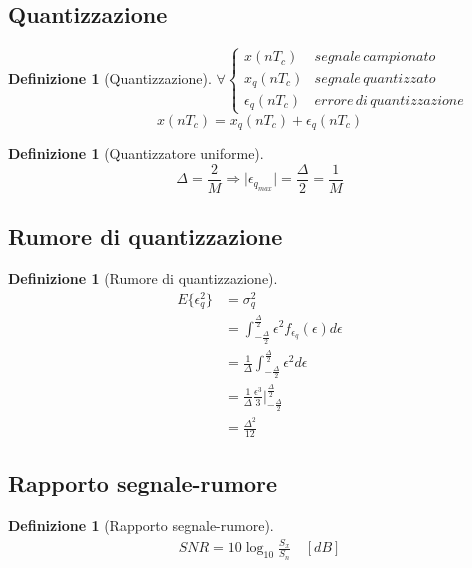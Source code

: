 \documentclass[a4paper,10pt]{article}
\theoremstyle{mystyle}
\newtheorem{definition}[theorem]{Definizione}
\begin{document}
\subsection{Quantizzazione}
\begin{definition}[Quantizzazione]
    \(\forall
    \begin{cases}
        x(nT_c) & segnale \, campionato \\
        x_q(nT_c) & segnale \, quantizzato \\
        \epsilon_q(nT_c) & errore \, di \, quantizzazione
    \end{cases}\)
    \[x(nT_c)=x_q(nT_c)+\epsilon_q(nT_c)\]
\end{definition}

\begin{definition}[Quantizzatore uniforme]
    \[\Delta = \frac{2}{M} \Rightarrow \lvert \epsilon_{q_{max}} \rvert = \frac{\Delta}{2}= \frac{1}{M}\]
\end{definition}

\subsection{Rumore di quantizzazione}
\begin{definition}[Rumore di quantizzazione]
    \[
        \begin{aligned}
            E\{\epsilon_q^2\}
            &= \sigma_q^2 \\
            &= \int_{-\frac{\Delta}{2}}^{\frac{\Delta}{2}} \epsilon^2 f_{\epsilon_q} (\epsilon) d\epsilon \\
            &= \frac{1}{\Delta} \int_{-\frac{\Delta}{2}}^{\frac{\Delta}{2}} \epsilon^2 d \epsilon \\
            &= \frac{1}{\Delta} \frac{\epsilon ^3}{3} \rvert_{-\frac{\Delta}{2}}^{\frac{\Delta}{2}} \\
            &= \frac{\Delta ^2}{12}
        \end{aligned}
    \]
\end{definition}

\subsection{Rapporto segnale-rumore}
\begin{definition}[Rapporto segnale-rumore]
    \[
        \begin{aligned}
            SNR = 10 \log_{10} \frac{S_x}{S_n} \hspace{1em} [dB]
        \end{aligned}
    \]
\end{definition}
\end{document}
